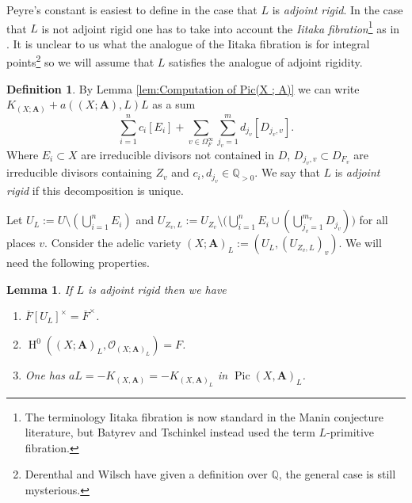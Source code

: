 \documentclass[a4paper,11pt,reqno]{amsart}
\newcommand{\Q}{\mathbb{Q}}
\DeclareMathOperator{\Pic}{Pic}
\DeclareMathOperator{\HH}{H}
\newtheorem{lemma}[theorem]{Lemma}
\theoremstyle{definition}
\newtheorem{definition}[theorem]{Definition}
\begin{document}
Peyre's constant is easiest to define in the case that $L$ is \emph{adjoint rigid}. In the case that $L$ is not adjoint rigid one has to take into account the \emph{Iitaka fibration}\footnote{The terminology Iitaka fibration is now standard in the Manin conjecture literature, but Batyrev and Tschinkel instead used the term $L$-primitive fibration.} as in \cite{Batyrev1998Polarized}. It is unclear to us what the analogue of the Iitaka fibration is for integral points\footnote{Derenthal and Wilsch \cite{Derenthal2025Iitaka} have given a definition over $\Q$, the general case is still mysterious.} so we will assume that $L$ satisfies the analogue of adjoint rigidity.

\begin{definition}
	By Lemma \ref{lem:Computation of Pic(X ; A)} we can write $K_{(X; \mathbf{A})} + a((X ; \mathbf{A}), L)L$ as a sum 
	\[
	\sum_{i = 1}^n c_i[E_i] + \sum_{v \in \Omega_F^{\infty}} \sum_{j_v = 1}^m d_{j_v} [D_{j_v, v}].
	\]
	Where $E_i \subset X$ are irreducible divisors not contained in $D$, $D_{j_v, v} \subset D_{F_v}$ are irreducible divisors containing $Z_v$ and $c_i, d_{j_v} \in \Q_{> 0}$. We say that $L$ is \emph{adjoint rigid} if this decomposition is unique.
\end{definition}
Let $U_L := U \setminus (\bigcup_{i = 1}^n E_i)$ and $U_{Z_v, L} := U_{Z_v} \setminus \Big(\bigcup_{i = 1}^n E_i \cup (\bigcup_{j_v = 1}^{m_v} D_{j_v})\Big)$ for all places $v$. Consider the adelic variety $(X ; \mathbf{A})_L := (U_L, (U_{Z_v, L})_{v})$. We will need the following properties.
\begin{lemma} \label{lem:Basic properties adjoint rigid}
	If $L$ is adjoint rigid then we have
	\begin{enumerate}
		\item $\overline{F}[U_L]^{\times} = \overline{F}^{\times}$.
		\item $\HH^0((X ; \mathbf{A})_L, \mathcal{O}_{(X ; \mathbf{A})_L}) = F$.
		\item One has $a L = - K_{(X, \mathbf{A})} = -K_{(X, \mathbf{A})_L}$ in $\Pic (X, \mathbf{A})_L$.
	\end{enumerate}
\end{lemma}
\end{document}

